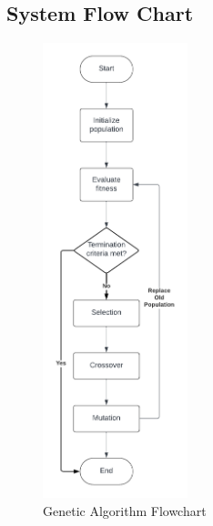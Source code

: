 \begin{appendices}
	\chapter{System Flow Chart}
	
	\begin{figure}[h!]
		\caption{Genetic Algorithm Flowchart}
		\centering
		\includegraphics[height=500px]{Genetic Algorithm Flowchart}
	\end{figure}
	

	
\end{appendices}